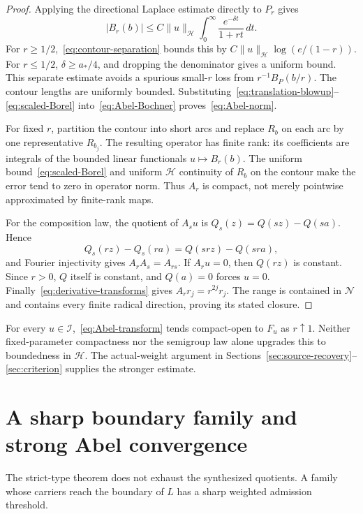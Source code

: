 \documentclass[11pt,a4paper]{article}
\numberwithin{equation}{section}
\theoremstyle{definition}
\theoremstyle{remark}
\newcommand{\Hh}{\mathcal H}
\newcommand{\Nn}{\mathcal N}
\newcommand{\Ii}{\mathcal I}
\newcommand{\norm}[1]{\lVert #1\rVert}
\begin{document}
\begin{proof}
Applying the directional Laplace estimate directly to $P_r$ gives
\begin{equation}\label{eq:scaled-Borel}
 |B_r(b)|\le C\norm{u}_{\Hh}
       \int_0^\infty\frac{e^{-\delta t}}{1+rt}\,dt.
\end{equation}
For $r\ge1/2$,~\eqref{eq:contour-separation} bounds this by
$C\norm{u}_{\Hh}\log(e/(1-r))$. For $r\le1/2$, $\delta\ge a_*/4$, and dropping the denominator gives a uniform bound. This separate estimate avoids a spurious small-$r$ loss from $r^{-1}B_P(b/r)$. The contour lengths are uniformly bounded. Substituting~\eqref{eq:translation-blowup}--\eqref{eq:scaled-Borel} into~\eqref{eq:Abel-Bochner} proves~\eqref{eq:Abel-norm}.

For fixed $r$, partition the contour into short arcs and replace $R_b$ on each arc by one representative $R_{b_j}$. The resulting operator has finite rank: its coefficients are integrals of the bounded linear functionals $u\mapsto B_r(b)$. The uniform bound~\eqref{eq:scaled-Borel} and uniform $\Hh$ continuity of $R_b$ on the contour make the error tend to zero in operator norm. Thus $A_r$ is compact, not merely pointwise approximated by finite-rank maps.

For the composition law, the quotient of $A_su$ is
$Q_s(z)=Q(sz)-Q(sa)$. Hence
\[
 Q_s(rz)-Q_s(ra)=Q(sr z)-Q(sr a),
\]
and Fourier injectivity gives $A_rA_s=A_{rs}$. If $A_ru=0$, then $Q(rz)$ is constant. Since $r>0$, $Q$ itself is constant, and $Q(a)=0$ forces $u=0$. Finally~\eqref{eq:derivative-transforms} gives $A_rr_j=r^{2j}r_j$. The range is contained in $\Nn$ and contains every finite radical direction, proving its stated closure.
\end{proof}

For every $u\in\Ii$,~\eqref{eq:Abel-transform} tends compact-open to $F_u$ as $r\uparrow1$. Neither fixed-parameter compactness nor the semigroup law alone upgrades this to boundedness in $\Hh$. The actual-weight argument in Sections~\ref{sec:source-recovery}--\ref{sec:criterion} supplies the stronger estimate.

\section{A sharp boundary family and strong Abel convergence}\label{sec:boundary-family}

The strict-type theorem does not exhaust the synthesized quotients. A family whose carriers reach the boundary of $L$ has a sharp weighted admission threshold.
\end{document}

